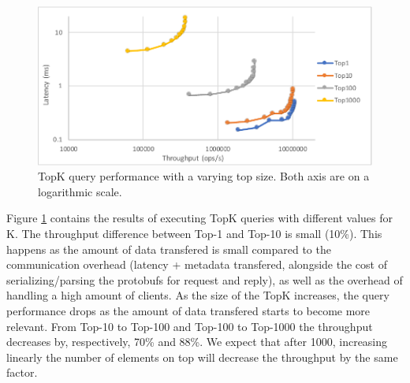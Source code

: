\documentclass{vldb}
\newcommand{\andre}[1]{\nbnote{Andre}{blue}{#1}}
\begin{document}
\begin{figure}
	\centering
	\includegraphics[width=.95\linewidth]{TopKTopSize0upd_cut}
	\caption{TopK query performance with a varying top size. Both axis are on a logarithmic scale.}
	\label{fig:TopkSize0upd}
\end{figure}

Figure \ref{fig:TopkSize0upd} contains the results of executing TopK queries with different values for K.
The throughput difference between Top-1 and Top-10 is small (10\%). This happens as the amount of data transfered is small compared to the communication overhead (latency + metadata transfered, alongside the cost of serializing/parsing the protobufs for request and reply), as well as the overhead of handling a high amount of clients.
As the size of the TopK increases, the query performance drops as the amount of data transfered starts to become more relevant.
From Top-10 to Top-100 and Top-100 to Top-1000 the throughput decreases by, respectively, 70\% and 88\%.
We expect that after 1000, increasing linearly the number of elements on top will decrease the throughput by the same factor.
\end{document}
